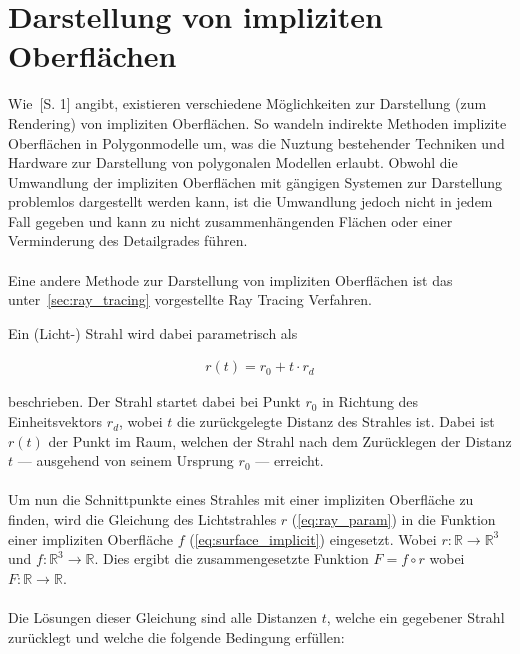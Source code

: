 
\section{Darstellung von impliziten Oberflächen}
\label{sec:description_implicit_surfaces}

Wie~\cite{hart_sphere_1994}[S. 1] angibt, existieren verschiedene Möglichkeiten
zur Darstellung (zum Rendering) von impliziten Oberflächen. So wandeln
indirekte Methoden implizite Oberflächen in Polygonmodelle um, was die Nuztung
bestehender Techniken und Hardware zur Darstellung von polygonalen Modellen
erlaubt. Obwohl die Umwandlung der impliziten Oberflächen mit gängigen Systemen
zur Darstellung problemlos dargestellt werden kann, ist die Umwandlung jedoch nicht
in jedem Fall gegeben und kann zu nicht zusammenhängenden Flächen oder einer
Verminderung des Detailgrades führen.\\
\\
Eine andere Methode zur Darstellung von impliziten Oberflächen ist das
unter~\ref{sec:ray_tracing} vorgestellte Ray Tracing Verfahren.

Ein (Licht-) Strahl wird dabei parametrisch als

\begin{gather}\label{eq:ray_param}
    r(t) = r_{0} + t \cdot r_{d}
\end{gather}

beschrieben. Der Strahl startet dabei bei Punkt $r_{0}$ in Richtung des
Einheitsvektors $r_{d}$, wobei $t$ die zurückgelegte Distanz des Strahles ist.
Dabei ist $r(t)$ der Punkt im Raum, welchen der Strahl nach dem Zurücklegen der
Distanz $t$ --- ausgehend von seinem Ursprung $r_{0}$ --- erreicht.\\
\\
Um nun die Schnittpunkte eines Strahles mit einer impliziten Oberfläche zu finden, wird die Gleichung des Lichtstrahles $r$ (\ref{eq:ray_param}) in die Funktion einer impliziten Oberfläche $f$ (\ref{eq:surface_implicit}) eingesetzt. Wobei $r : \mathbb{R} \to \mathbb{R}^{3}$ und $f : \mathbb{R}^{3} \to \mathbb{R}$. Dies ergibt die zusammengesetzte Funktion $F = f \circ r$ wobei $F : \mathbb{R} \to \mathbb{R}$.\\
\\
Die Lösungen dieser Gleichung sind alle Distanzen $t$, welche ein gegebener Strahl zurücklegt und welche die folgende Bedingung erfüllen:

